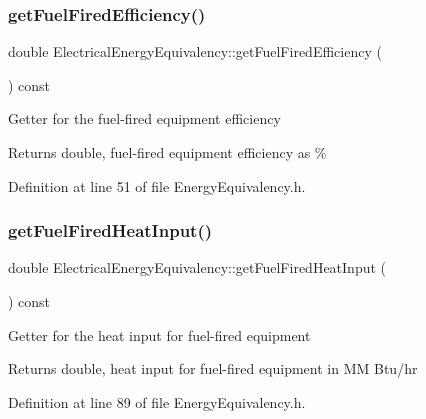 \subsubsection{\texorpdfstring{get\+Fuel\+Fired\+Efficiency()}{getFuelFiredEfficiency()}}
{\footnotesize\ttfamily double Electrical\+Energy\+Equivalency\+::get\+Fuel\+Fired\+Efficiency (\begin{DoxyParamCaption}{ }\end{DoxyParamCaption}) const\hspace{0.3cm}{\ttfamily [inline]}}

Getter for the fuel-\/fired equipment efficiency

\begin{DoxyReturn}{Returns}
double, fuel-\/fired equipment efficiency as \% 
\end{DoxyReturn}


Definition at line 51 of file Energy\+Equivalency.\+h.

\mbox{\label{class_electrical_energy_equivalency_acb07f4cd7d416922bc355b2f1b3aadb4}} 
\subsubsection{\texorpdfstring{get\+Fuel\+Fired\+Heat\+Input()}{getFuelFiredHeatInput()}}
{\footnotesize\ttfamily double Electrical\+Energy\+Equivalency\+::get\+Fuel\+Fired\+Heat\+Input (\begin{DoxyParamCaption}{ }\end{DoxyParamCaption}) const\hspace{0.3cm}{\ttfamily [inline]}}

Getter for the heat input for fuel-\/fired equipment

\begin{DoxyReturn}{Returns}
double, heat input for fuel-\/fired equipment in MM Btu/hr 
\end{DoxyReturn}


Definition at line 89 of file Energy\+Equivalency.\+h.

\mbox{\label{class_electrical_energy_equivalency_ab9091e720096a4c088cece14e975ccb4}} 
